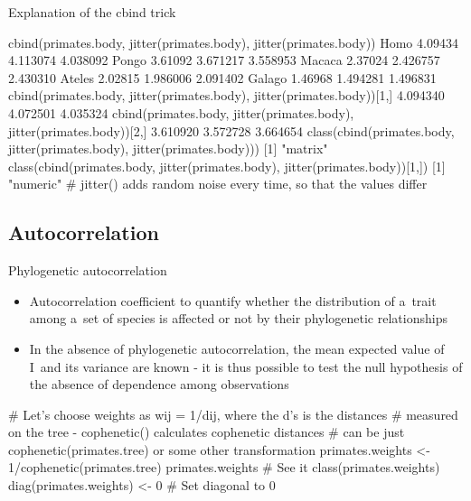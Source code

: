 \documentclass[compress, ucs, xelatex, 11pt, xcolor=svgnames,
  hyperref={
    bookmarks=true,
    unicode=true,
    colorlinks=true,
    pdftitle={Molecular data in R},
    plainpages=false,
    pdfauthor={Vojtech Zeisek},
    pdfsubject={Course about phylogeny and evolution in R},
    pdfcreator={XeLaTeX},
    pdfkeywords={R, evolution, phylogeny, molecular data},
    linkcolor=Tomato,
    anchorcolor=SaddleBrown,
    citecolor=Goldenrod,
    filecolor=DarkMagenta,
    menucolor=Sienna,
    urlcolor=DarkTurquoise,
    pdftex},
  url={hyphens, lowtilde} %
  ]{beamer}
\begin{document}
\begin{frame}[fragile]{Explanation of the cbind trick}
  \begin{spluscode}
    cbind(primates.body, jitter(primates.body), jitter(primates.body))
    Homo         4.09434 4.113074 4.038092
    Pongo        3.61092 3.671217 3.558953
    Macaca       2.37024 2.426757 2.430310
    Ateles       2.02815 1.986006 2.091402
    Galago       1.46968 1.494281 1.496831
    cbind(primates.body, jitter(primates.body), jitter(primates.body))[1,]
      4.094340      4.072501      4.035324 
    cbind(primates.body, jitter(primates.body), jitter(primates.body))[2,]
      3.610920      3.572728      3.664654 
    class(cbind(primates.body, jitter(primates.body),
      jitter(primates.body)))
    [1] "matrix"
    class(cbind(primates.body, jitter(primates.body),
      jitter(primates.body))[1,])
    [1] "numeric"
    # jitter() adds random noise every time, so that the values differ
  \end{spluscode}
\end{frame}

\subsection{Autocorrelation}

\begin{frame}[fragile]{Phylogenetic autocorrelation}
  \begin{itemize}
    \item Autocorrelation coefficient to quantify whether the distribution of a~trait among a~set of species is affected or not by their phylogenetic relationships
    \item In the absence of phylogenetic autocorrelation, the mean expected value of I~and its variance are known - it is thus possible to test the null hypothesis of the absence of dependence among observations
  \end{itemize}
  \begin{spluscode}
    # Let's choose weights as wij = 1/dij, where the d’s is the distances
    # measured on the tree - cophenetic() calculates cophenetic distances
    # can be just cophenetic(primates.tree) or some other transformation
    primates.weights <- 1/cophenetic(primates.tree)
    primates.weights # See it
    class(primates.weights)
    diag(primates.weights) <- 0 # Set diagonal to 0
\end{spluscode}
\end{frame}
\end{document}
